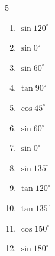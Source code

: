 \begin{multicols}{5}
\begin{enumerate}
        \phantom{$\displaystyle =0$}

  \item $\displaystyle \sin{120^\circ}$


  \item $\displaystyle \sin{0^\circ}$

        \phantom{$\displaystyle =0$}

  \item $\displaystyle \sin{60^\circ}$


  \item $\displaystyle \tan{90^\circ}$

        \phantom{$\displaystyle なし$}

  \item $\displaystyle \cos{45^\circ}$


  \item $\displaystyle \sin{60^\circ}$


  \item $\displaystyle \sin{0^\circ}$

        \phantom{$\displaystyle =0$}

\columnbreak %

  \item $\displaystyle \sin{135^\circ}$


  \item $\displaystyle \tan{120^\circ}$


  \item $\displaystyle \tan{135^\circ}$

        \phantom{$\displaystyle =-1$}

  \item $\displaystyle \cos{150^\circ}$


  \item $\displaystyle \sin{180^\circ}$

        \phantom{$\displaystyle =0$}


\end{enumerate}
\end{multicols}
